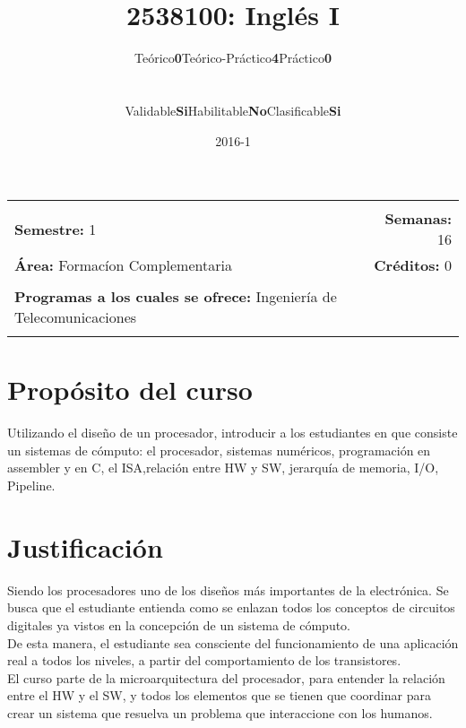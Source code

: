 \documentclass[11pt]{article}
\title{2538100: Inglés I}
\author{\begin{tabular} {c|c|c|c|c|c} Teórico & \textbf{0} & Teórico-Práctico & \textbf{4} & Práctico & \textbf{0}\end{tabular}
\\
\begin{tabular} {c|c|c|c|c|c} Validable & \textbf{Si} & Habilitable & \textbf{No} & Clasificable & \textbf{Si}\end{tabular}}
\date{2016-1}
\newcommand{\blankline}{\quad\pagebreak[2]}
\begin{document}
\maketitle

\begin{tabular*}{.93\textwidth}{@{\extracolsep{\fill}}lr}
\hline\\

\textbf{Semestre:} 1 & \textbf{Semanas:} 16
\\
\textbf{Área:} Formacíon Complementaria &    \textbf{Créditos:} 0 
\\ & \\
\textbf{Programas a los cuales se ofrece:} Ingeniería de Telecomunicaciones
\\ & \\
\hline
\end{tabular*}

\vspace{5 mm}

\section*{Propósito del curso}

Utilizando el diseño de un procesador, introducir a los estudiantes en que consiste un sistemas de cómputo: el procesador, sistemas numéricos, programación en assembler y en C, el ISA,relación entre HW y SW, jerarquía de memoria, I/O, Pipeline.



\section*{Justificación}

Siendo los procesadores uno de los diseños más importantes de la electrónica. Se busca que el estudiante entienda como se enlazan todos los conceptos de circuitos digitales ya vistos en la concepción de un sistema de cómputo.
\\De esta manera, el estudiante sea consciente del funcionamiento de una aplicación real a todos los niveles, a partir del comportamiento de los transistores.
\\El curso parte de la microarquitectura del procesador, para entender la relación entre el HW y el SW, y todos los elementos que se tienen que coordinar para crear un sistema que resuelva un problema que interaccione con los humanos.
\end{document}
